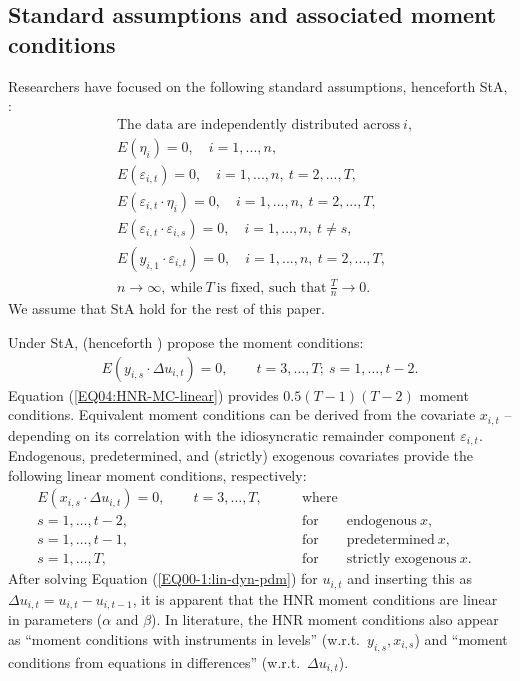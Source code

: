 \subsection{Standard assumptions and associated moment conditions}\label{sec:StdAssumpt}
Researchers have focused on the following standard assumptions, henceforth StA, \citep[see][]{AhnSch1995}:
\begin{align} \label{EQ02:StdAssumpt}
& \text{The data are independently distributed across} \ i, \\
& E(\eta_i) = 0, \quad i=1,...,n, \nonumber \\
& E(\varepsilon_{i,t}) = 0, \quad i=1,...,n,\ t=2,...,T, \nonumber \\
& E(\varepsilon_{i,t} \cdot \eta_i) = 0, \quad i=1,...,n,\ t=2,...,T, \nonumber \\
& E(\varepsilon_{i,t} \cdot \varepsilon_{i,s}) = 0, \quad i=1,...,n,\ t \neq s, \nonumber \\
& E(y_{i,1} \cdot \varepsilon_{i,t}) = 0, \quad i=1,...,n,\ t=2,...,T, \nonumber \\
& n \rightarrow \infty, \ \text{while}\ T \  \text{is fixed, such that}\ \frac{T}{n} \rightarrow 0. \nonumber
\end{align}
We assume that StA hold for the rest of this paper.

Under StA, \citet{HolNewRos1988} (henceforth ) propose the moment conditions:
\begin{align}\label{EQ04:HNR-MC-linear}
E(y_{i,s} \cdot \Delta u_{i,t}) = 0, \qquad t = 3,\dots,T;\ s = 1,\dots,t - 2.
\end{align}
Equation (\ref{EQ04:HNR-MC-linear}) provides $0.5(T-1)(T-2)$ moment conditions.
Equivalent moment conditions can be derived from the covariate $x_{i,t}$ -- depending on its correlation with the idiosyncratic remainder component $\varepsilon_{i,t}$. Endogenous, predetermined, and (strictly) exogenous covariates provide the following linear moment conditions, respectively:
\begin{align} \label{EQ06:HNR-MC-linear-x_it}
E(x_{i,s} \cdot \Delta u_{i,t}) = 0, \qquad t = 3,\dots,T, \qquad &\text{where}& \\
s = 1,\dots,t - 2, \qquad &\text{for} \qquad \text{endogenous}\ x, \nonumber \\
s = 1,\dots,t - 1, \qquad &\text{for} \qquad \text{predetermined}\ x, \nonumber \\
s = 1,\dots,T,     \qquad &\text{for} \qquad \text{strictly exogenous}\ x. \nonumber
\end{align}
After solving Equation (\ref{EQ00-1:lin-dyn-pdm}) for $u_{i,t}$ and inserting this as $\Delta u_{i,t} = u_{i, t} - u_{i, t - 1}$, it is apparent that the HNR moment conditions are linear in parameters ($\alpha$ and $\beta$). In literature, the HNR moment conditions also appear as ``moment conditions with instruments in levels'' (w.r.t.\ $y_{i,s}, x_{i, s}$) and ``moment conditions from equations in differences'' (w.r.t.\ $\Delta u_{i, t}$).





